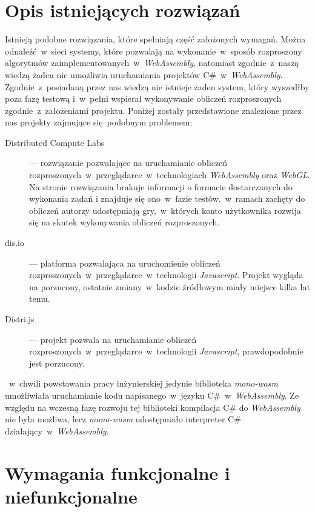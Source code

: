 \documentclass[a4paper,11pt,twoside]{report}
\theoremstyle{definition}
\begin{document}
    \section{Opis istniejących rozwiązań}
        Istnieją podobne rozwiązania, które spełniają część założonych wymagań.
        Można odnaleźć~w~sieci systemy, które pozwalają na wykonanie~w~sposób rozproszony algorytmów  zaimplementowanych~w~\textit{WebAssembly}, natomiast zgodnie~z~naszą wiedzą żaden nie umożliwia uruchamiania projektów C\#~w~\textit{WebAssembly}.
        Zgodnie~z~posiadaną przez nas wiedzą nie istnieje żaden system, który wyszedłby poza fazę testową i~w~pełni wspierał wykonywanie obliczeń rozproszonych zgodnie~z~założeniami projektu.
        Poniżej zostały przedstawione znalezione przez nas projekty zajmujące się podobnym problemem:
        
        \begin{description}
            \item[Distributed Compute Labs~\cite{distributed-compute-labs}] --- rozwiązanie pozwalające na uruchamianie obliczeń rozproszonych~w~przeglądarce~w~technologiach \textit{WebAssembly} oraz \textit{WebGL}. Na stronie rozwiązania brakuje informacji o formacie dostarczanych do wykonania zadań i znajduje się ono~w~fazie testów.~w~ramach zachęty do obliczeń autorzy udostępniają gry,~w~których konto użytkownika rozwija się na skutek wykonywania obliczeń rozproszonych.
            \item[dis.io~\cite{dis-io}] --- platforma pozwalająca na uruchomienie obliczeń rozproszonych~w~przeglądarce~w~technologii \textit{Javascript}. Projekt wygląda na porzucony, ostatnie zmiany~w~kodzie źródłowym miały miejsce kilka lat temu.
            \item[Distri.js~\cite{distri-js}] --- projekt pozwala na uruchamianie obliczeń rozproszonych~w~przeglądarce~w~technologii \textit{Javascript}, prawdopodobnie jest porzucony.
        \end{description}
        
        
       ~w~chwili powstawania pracy inżynierskiej jedynie biblioteka \textit{mono-wasm} umożliwiała uruchamianie kodu napisanego~w~języku C\#~w~\textit{WebAssembly}.
        Ze względu na wczesną fazę rozwoju tej biblioteki kompilacja C\# do \textit{WebAssembly} nie była możliwa, lecz \textit{mono-wasm} udostępniało interpreter C\# działający~w~\textit{WebAssembly}.
        
		\section{Wymagania funkcjonalne i niefunkcjonalne}
                
\end{document}
